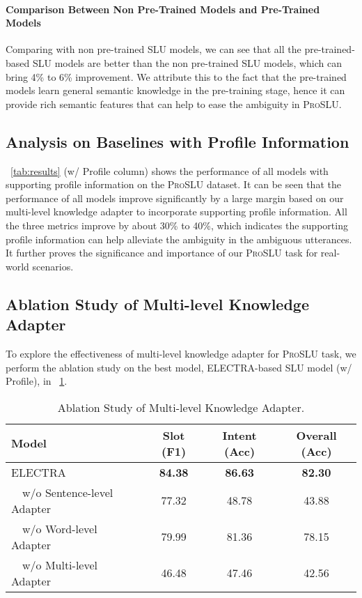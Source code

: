 \documentclass[letterpaper]{article} \usepackage{aaai22}  \usepackage{times}  \usepackage{helvet}  \usepackage{courier}  \usepackage[hyphens]{url}  \usepackage{graphicx} \urlstyle{rm} \def\UrlFont{\rm}  \usepackage{natbib}  \usepackage{caption} \DeclareCaptionStyle{ruled}{labelfont=normalfont,labelsep=colon,strut=off} \frenchspacing  \setlength{\pdfpagewidth}{8.5in}  \setlength{\pdfpageheight}{11in}  \usepackage{algorithm}
\begin{document}
\paragraph{Comparison Between Non Pre-Trained Models and Pre-Trained Models}
Comparing with non pre-trained SLU models, we can see that all the pre-trained-based SLU models are better than the non pre-trained SLU models, which can bring 4\% to 6\% improvement.
We attribute this to the fact that the pre-trained models learn general semantic knowledge in the pre-training stage, hence it can provide rich semantic features that can help to ease the ambiguity in \textsc{ProSLU}.

\subsection{Analysis on Baselines with Profile Information}
\tablename~\ref{tab:results} (w/ Profile column) shows the performance of all models with supporting profile information on the \textsc{ProSLU} dataset.
It can be seen that the performance of all models improve significantly by a large margin based on our multi-level knowledge adapter to incorporate supporting profile information.
All the three metrics improve by about 30\% to 40\%, which indicates the supporting profile information can help alleviate the ambiguity in the ambiguous utterances.
It further proves the significance and importance of our \textsc{ProSLU} task for real-world scenarios.

\subsection{Ablation Study of Multi-level Knowledge Adapter}
To explore the effectiveness of multi-level knowledge adapter for \textsc{ProSLU} task, we perform the ablation study on the best model, ELECTRA-based SLU model (w/ Profile), in \tablename~\ref{tab:results-ablation}.

\begin{table}[t]
	\centering
	\begin{adjustbox}{width=0.47\textwidth}
		\begin{tabular}{lccc}
			\toprule
            \textbf{Model}
			& \textbf{Slot (F1)}  & \textbf{Intent (Acc)}   & \textbf{Overall (Acc)} \\ 
			\midrule
            ELECTRA & \textbf{84.38} & \textbf{86.63} & \textbf{82.30} \\ 
			\hdashline
            ~~w/o Sentence-level Adapter & 77.32 & 48.78 & 43.88  \\
			~~w/o Word-level Adapter & 79.99 & 81.36 & 78.15 \\
			~~w/o Multi-level Adapter & 46.48 & 47.46 & 42.56 \\ 
            \bottomrule
		\end{tabular}
	\end{adjustbox}
	\caption{Ablation Study of Multi-level Knowledge Adapter.}
	\label{tab:results-ablation}
\end{table}
\end{document}
